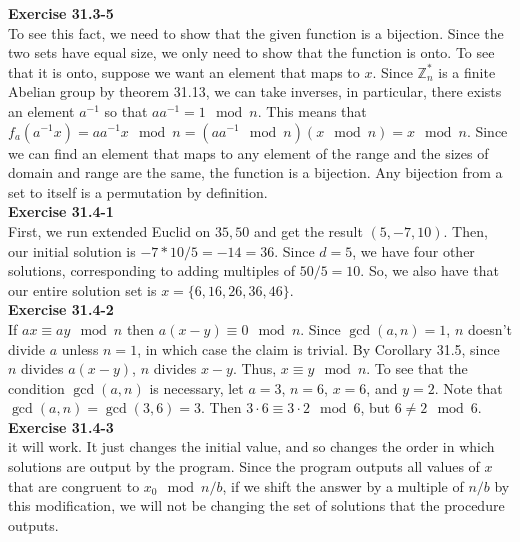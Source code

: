 \documentclass{article}
\newcommand{\Z}{\mathbb{Z}}
\begin{document}
\noindent\textbf{Exercise 31.3-5}\\

To see this fact, we need to show that the given function is a bijection. Since the two sets have equal size, we only need to show that the function is onto. To see that it is onto, suppose we want an element that maps to $x$. Since $\Z_n^*$ is a finite Abelian group by theorem 31.13, we can take inverses, in particular, there exists an element $a^{-1}$ so that $a a^{-1} = 1 \mod n$. This means that $f_a(a^{-1} x) =a a^{-1} x \mod n = (a a^{-1} \mod n) (x \mod n) = x \mod n$. Since we can find an element that maps to any element of the range and the sizes of domain and range are the same, the function is a bijection. Any bijection from a set to itself is a permutation by definition.\\



\noindent\textbf{Exercise 31.4-1}\\

First, we run extended Euclid on $35,50$ and get the result $(5,-7,10)$. Then, our initial solution is $-7*10/5 = -14 = 36$. Since $d=5$, we have four other solutions, corresponding to adding multiples of $50/5 =10$. So, we also have that our entire solution set is $x =\{6,16,26,36,46\}$.\\

\noindent\textbf{Exercise 31.4-2}\\

If $ax \equiv ay \mod n$ then $a(x-y) \equiv 0 \mod n$.  Since $\gcd(a,n) = 1$, $n$ doesn't divide $a$ unless $n = 1$, in which case the claim is trivial.  By Corollary 31.5, since $n$ divides $a(x-y)$, $n$ divides $x-y$.  Thus, $x \equiv y \mod n$.  To see that the condition $\gcd(a,n)$ is necessary, let $a=3$, $n=6$, $x=6$, and $y=2$.  Note that $\gcd(a,n) = \gcd(3,6) = 3$.  Then $3\cdot 6 \equiv 3\cdot 2 \mod 6$, but $6 \neq 2 \mod 6$. \\

\noindent\textbf{Exercise 31.4-3}\\

it will work. It just changes the initial value, and so changes the order in which solutions are output by the program. Since the program outputs all values of $x$ that are congruent to $x_0 \mod n/b$, if we shift the answer by a multiple of $n/b$ by this modification, we will not be changing the set of solutions that the procedure outputs.\\
\end{document}
